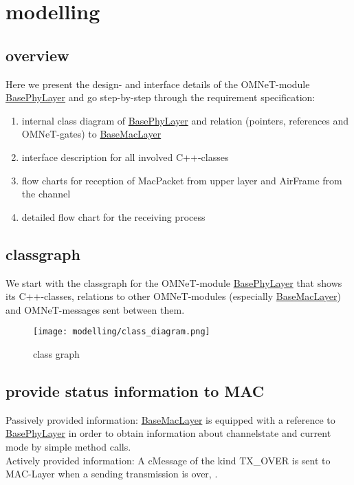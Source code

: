 \newcommand{\h}[1]{\underline{#1}}
\newcommand{\bp}{BasePhyLayer}
\newcommand{\bm}{BaseMacLayer}


\section{modelling}

\subsection{overview}

Here we present the design- and interface details of the OMNeT-module \h{\bp} and go step-by-step through the requirement specification:

\begin{enumerate}
 \item internal class diagram of \h{\bp} and relation (pointers, references and OMNeT-gates) to \h{\bm}
 \item interface description for all involved \textsf{C++}-classes
 \item flow charts for reception of MacPacket from upper layer and AirFrame from the channel
 \item detailed flow chart for the receiving process
\end{enumerate}

\subsection{classgraph}

We start with the classgraph for the OMNeT-module \h{\bp} that shows its
\textsf{C++}-classes, relations to other OMNeT-modules (especially \h{\bm})
and OMNeT-messages sent between them.

\begin{figure}[h]
 \centering
 \texttt{[image: modelling/class\_diagram.png]}
 \caption{class graph}
 \label{fig: classgraph}
\end{figure}


\subsection{provide status information to MAC}

Passively provided information: \h{\bm} is equipped with a reference to \h{\bp} in order to obtain information
about channelstate and current mode by
simple method calls. \\
Actively provided information: A cMessage of the kind TX\_OVER
is sent to MAC-Layer when a sending transmission is over, .

